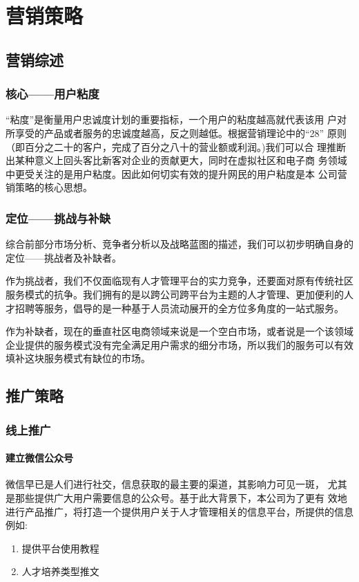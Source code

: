 \documentclass[master]{hduthesis}
\begin{document}
\section{营销策略}
\subsection{营销综述}
\subsubsection{核心——用户粘度}
“粘度”是衡量用户忠诚度计划的重要指标，一个用户的粘度越高就代表该用 户对所享受的产品或者服务的忠诚度越高，反之则越低。根据营销理论中的“28” 原则（即百分之二十的客户，完成了百分之八十的营业额或利润。)我们可以合 理推断出某种意义上回头客比新客对企业的贡献更大，同时在虚拟社区和电子商 务领域中更受关注的是用户粘度。因此如何切实有效的提升网民的用户粘度是本 公司营销策略的核心思想。
\subsubsection{定位——挑战与补缺}
综合前部分市场分析、竞争者分析以及战略蓝图的描述，我们可以初步明确自身的定位——挑战者及补缺者。

作为挑战者，我们不仅面临现有人才管理平台的实力竞争，还要面对原有传统社区服务模式的抗争。我们拥有的是以跨公司跨平台为主题的人才管理、更加便利的人才招聘等服务，倡导的是一种基于人员流动展开的全方位多角度的一站式服务。

作为补缺者，现在的垂直社区电商领域来说是一个空白市场，或者说是一个该领域企业提供的服务模式没有完全满足用户需求的细分市场，所以我们的服务可以有效填补这块服务模式有缺位的市场。
\subsection{推广策略}
\subsubsection{线上推广}
\paragraph{建立微信公众号}


微信早已是人们进行社交，信息获取的最主要的渠道，其影响力可见一斑， 尤其是那些提供广大用户需要信息的公众号。基于此大背景下，本公司为了更有 效地进行产品推广，将打造一个提供用户关于人才管理相关的信息平台，所提供的信息例如:
\begin{enumerate}[1)]
	\item 提供平台使用教程
	\item 人才培养类型推文
\end{enumerate}
\end{document}
